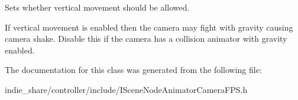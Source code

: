 Sets whether vertical movement should be allowed. 

If vertical movement is enabled then the camera may fight with gravity causing camera shake. Disable this if the camera has a collision animator with gravity enabled. 

The documentation for this class was generated from the following file\+:\begin{DoxyCompactItemize}
\item 
indie\+\_\+share/controller/include/I\+Scene\+Node\+Animator\+Camera\+F\+P\+S.\+h\end{DoxyCompactItemize}
